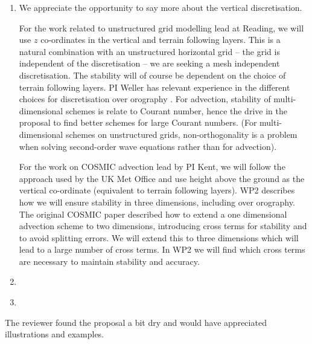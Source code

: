 \begin{enumerate}

\item \label{it:horizVert} We appreciate the opportunity to say more about the vertical discretisation.

For the work related to unstructured grid modelling lead at Reading, we will use $z$ co-ordinates in the vertical and terrain following layers. This is a natural combination with an unstructured horizontal grid -- the grid is independent of the discretisation -- we are seeking a mesh independent discretisation. The stability will of course be dependent on the choice of terrain following layers. PI Weller has relevant experience in the different choices for discretisation over orography \cite[]{WS14,SW16,CWPS17,SWMD17}. For advection, stability of multi-dimensional schemes is relate to Courant number, hence the drive in the proposal to find better schemes for large Courant numbers. (For multi-dimensional schemes on unstructured grids, non-orthogonality is a problem when solving second-order wave equations rather than for advection).

For the work on COSMIC advection lead by PI Kent, we will follow the approach used by the UK Met Office and use height above the ground as the vertical co-ordinate (equivalent to terrain following layers). WP2 describes how we will ensure stability in three dimensions, including over orography. The original COSMIC paper \cite[]{LLM96} described how to extend a one dimensional advection scheme to two dimensions, introducing cross terms for stability and to avoid splitting errors. We will extend this to three dimensions which will lead to a large number of cross terms. In WP2 we will find which cross terms are necessary to maintain stability and accuracy.

\item \label{it:Kuhnlein} 

\item \label{it:interlinkages} 

\end{enumerate}

The reviewer found the proposal a bit dry and would have appreciated illustrations and examples. 

\renewcommand{\refname}{References}




